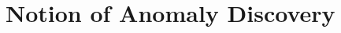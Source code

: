 \documentclass[9pt,journal,compsoc]{IEEEtran}
\begin{document}
{\section{Notion of Anomaly Discovery}
   

}



              



\end{document}
